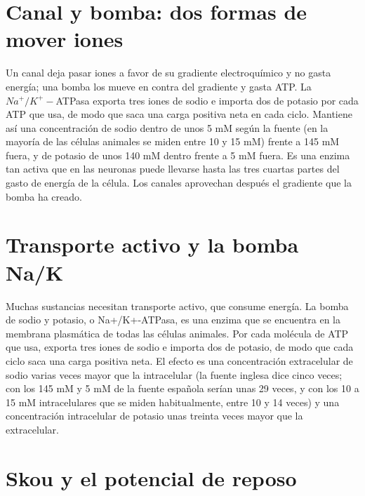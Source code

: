 \documentclass{book}
\begin{document}

\section{Canal y bomba: dos formas de mover iones}

Un canal deja pasar iones a favor de su gradiente electroquímico y no gasta energía; una bomba los mueve en contra del gradiente y gasta ATP. La \(Na^{+}/K^{+}-\)ATPasa exporta tres iones de sodio e importa dos de potasio por cada ATP que usa, de modo que saca una carga positiva neta en cada ciclo. Mantiene así una concentración de sodio dentro de unos 5 mM según la fuente (en la mayoría de las células animales se miden entre 10 y 15 mM) frente a 145 mM fuera, y de potasio de unos 140 mM dentro frente a 5 mM fuera. Es una enzima tan activa que en las neuronas puede llevarse hasta las tres cuartas partes del gasto de energía de la célula. Los canales aprovechan después el gradiente que la bomba ha creado.


\section{Transporte activo y la bomba Na/K}

Muchas sustancias necesitan transporte activo, que consume energía. La bomba de sodio y potasio, o Na+/K+-ATPasa, es una enzima que se encuentra en la membrana plasmática de todas las células animales. Por cada molécula de ATP que usa, exporta tres iones de sodio e importa dos de potasio, de modo que cada ciclo saca una carga positiva neta. El efecto es una concentración extracelular de sodio varias veces mayor que la intracelular (la fuente inglesa dice cinco veces; con los 145 mM y 5 mM de la fuente española serían unas 29 veces, y con los 10 a 15 mM intracelulares que se miden habitualmente, entre 10 y 14 veces) y una concentración intracelular de potasio unas treinta veces mayor que la extracelular.


\section{Skou y el potencial de reposo}
\end{document}
